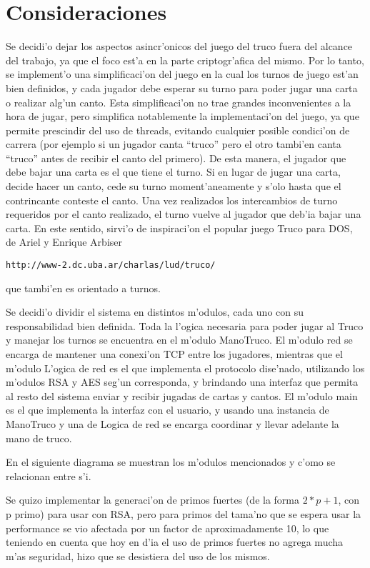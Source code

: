 \section{Consideraciones}
Se decidi'o dejar los aspectos asincr'onicos del juego del truco fuera del alcance del trabajo, ya que el foco est'a en la parte criptogr'afica del mismo.
Por lo tanto, se implement'o una simplificaci'on del juego en la cual los turnos de juego est'an bien definidos, y cada jugador debe esperar su turno para poder jugar una carta o realizar alg'un canto. Esta simplificaci'on no trae grandes inconvenientes a la hora de jugar, pero simplifica notablemente la implementaci'on del juego, ya que permite prescindir del uso de threads, evitando cualquier posible condici'on de carrera (por ejemplo si un jugador canta ``truco'' pero el otro tambi'en canta ``truco'' antes de recibir el canto del primero).
De esta manera, el jugador que debe bajar una carta es el que tiene el turno. Si en lugar de jugar una carta, decide hacer un canto, cede su turno moment'aneamente y s'olo hasta que el contrincante conteste el canto. Una vez realizados los intercambios de turno requeridos por el canto realizado, el turno vuelve al jugador que deb'ia bajar una carta.
En este sentido, sirvi'o de inspiraci'on el popular juego Truco para DOS, de Ariel y Enrique Arbiser

\begin{verbatim}
http://www-2.dc.uba.ar/charlas/lud/truco/
\end{verbatim}

que tambi'en es orientado a turnos.


Se decidi'o dividir el sistema en distintos m'odulos, cada uno con su responsabilidad bien definida. Toda la l'ogica necesaria para poder jugar al Truco y manejar los turnos se encuentra en el m'odulo ManoTruco. El m'odulo red se encarga de mantener una conexi'on TCP entre los jugadores, mientras que el m'odulo L'ogica de red es el que implementa el protocolo dise'nado, utilizando los m'odulos RSA y AES seg'un corresponda, y brindando una interfaz que permita al resto del sistema enviar y recibir jugadas de cartas y cantos. El m'odulo main es el que implementa la interfaz con el usuario, y usando una instancia de ManoTruco y una de Logica de red se encarga coordinar y llevar adelante la mano de truco.

En el siguiente diagrama se muestran los m'odulos mencionados y c'omo se relacionan entre s'i.



Se quizo implementar la generaci'on de primos fuertes (de la forma $2 * p + 1$, con p primo) para usar con RSA, pero para primos del tama'no que se espera usar la performance se vio afectada por un factor de aproximadamente 10, lo que teniendo en cuenta que hoy en d'ia el uso de primos fuertes no agrega mucha m'as seguridad, hizo que se desistiera del uso de los mismos.
